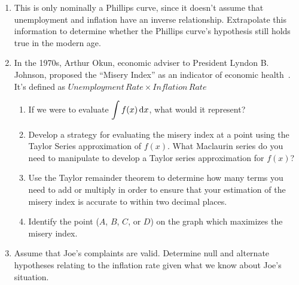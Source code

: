 \begin{enumerate}[itemsep=0.5cm]
\begin{adjustwidth}{0.3in}{0.3in}
\begin{enumerate}[itemsep=0.5cm]
                        \item This is only nominally a Phillips curve,
                              since it doesn't assume that unemployment
                              and inflation have an inverse
                              relationship. Extrapolate this information
                              to determine whether the Phillips curve's
                              hypothesis still holds true in the modern
                              age.

                              \clearpage

                        \item
                              In the 1970s, Arthur Okun, economic adviser to
                              President Lyndon B. Johnson, proposed the ``Misery
                              Index'' as an indicator of economic
                              health~\cite{inflationdata}. It's defined as
                              $Unemployment\,Rate \times Inflation\,Rate$

                              \begin{enumerate}
                                    \item If we were to evaluate $\displaystyle \int f(x) \,
                                                \differential x$, what would it represent?

                                    \item Develop a strategy for evaluating the misery
                                          index at a point using the Taylor Series
                                          approximation of $f(x)$. What Maclaurin series do
                                          you need to manipulate to develop a Taylor series
                                          approximation for $f(x)$?

                                    \item Use the Taylor remainder theorem to determine
                                          how many terms you need to add or multiply in order
                                          to ensure that your estimation of the misery index
                                          is accurate to within two decimal places.

                                    \item Identify the point ($A$, $B$, $C$, or
                                          $D$) on the graph which maximizes the misery
                                          index.
                              \end{enumerate}
                        \item Assume that Joe's complaints are valid. Determine null
                              and alternate hypotheses relating to the inflation rate
                              given what we know about Joe's situation.


\end{enumerate}
\end{adjustwidth}
\end{enumerate}
